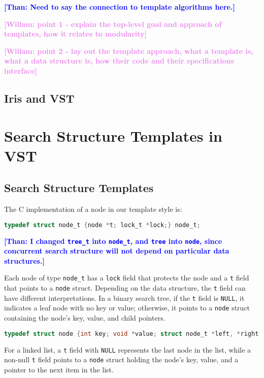 \documentclass[a4paper,UKenglish,cleveref, autoref, thm-restate]{lipics-v2021}
\newcommand{\than}[1]{\textbf{\textcolor{blue}{[Than: #1]}}}
\newcommand{\wm}[1]{\textbf{\textcolor{violet}{[Willam: #1]}}}
\begin{document}
\than{Need to say the connection to template algorithms here.} 

\wm{point 1 - explain the top-level goal and approach of templates, how it relates to modularity}

\wm{point 2 - lay out the template approach, what a template is, what a data structure is, how their code and their specifications interface}

\subsection{Iris and VST}


\section{Search Structure Templates in VST}

\subsection{Search Structure Templates}
The C implementation of a node in our template style is:
\begin{lstlisting}[language = C, backgroundcolor=\color{white}, basicstyle=\ttfamily\footnotesize]
typedef struct node_t {node *t; lock_t *lock;} node_t;
\end{lstlisting}
\than{I changed \lstinline{tree_t} into \lstinline{node_t}, and \lstinline{tree} into \lstinline{node}, since concurrent search structure will not depend on particular data structures.} 

Each node of type \lstinline{node_t} has a \lstinline{lock} field that protects the node and a \lstinline{t} field that points to a \lstinline{node} struct. Depending on the data structure, the \lstinline{t} field can have different interpretations. In a binary search tree, if the \lstinline{t} field is \lstinline{NULL}, it indicates a leaf node with no key or value; otherwise, it points to a \lstinline{node} struct containing the node's key, value, and child pointers. 
\begin{lstlisting}[language = C, backgroundcolor=\color{white}, basicstyle=\ttfamily\footnotesize]
typedef struct node {int key; void *value; struct node_t *left, *right;} node;
\end{lstlisting}

For a linked list, a \lstinline{t} field with \lstinline{NULL} represents the last node in the list, while a non-null \lstinline{t} field points to a \lstinline{node} struct holding the node's key, value, and a pointer to the next item in the list. 
\end{document}
